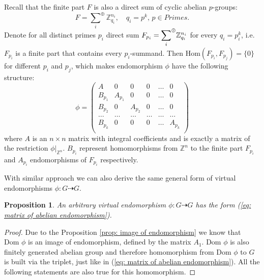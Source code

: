 \documentclass[a4paper,12pt]{amsart}
\newtheorem{proposition}[theorem]{Proposition}
\theoremstyle{definition}
\newcommand{\Dom}{\text{Dom }}
\newcommand{\Hom}{\text{Hom}}
\begin{document}
	
	Recall that the finite part $F$ is also a direct sum of cyclic abelian $p$-groups:
	$$
	F = {\sum_{i}}^\oplus \mathbb{Z}_{q_i}^{n_i}, \quad q_i = p^k, \, p \in Primes.
	$$
	Denote for all distinct primes $p_{i}$ direct sum $F_{p_i} = {\mathlarger\sum_{i}}^\oplus \mathbb{Z}_{q_i}^{n_i}$ for every $q_i = p_i^k$, i.e. $F_{p_i}$ is a finite part that contains every $p_i$-summand. Then $\Hom(F_{p_i}, F_{p_j}) = \{0\}$ for different $p_i$ and $p_j$, which makes endomorphism $\phi$ have the following structure:
	\begin{equation} \label{eq: matrix of abelian endomorphism}	
		\phi = 		
		\begin{pmatrix}
			A       &  0       & 0        & 0 & \dots & 0 \\  
			B_{p_1} &  A_{p_1} & 0        & 0 & \dots & 0 \\   
			B_{p_2} &  0       & A_{p_2}  & 0 & \dots & 0 \\ 
			\dots     & \dots    & \dots    & \dots & \dots & \dots  \\
			B_{p_k} &  0       & 0        & 0 & \dots & A_{p_k} \\  
		\end{pmatrix}
	\end{equation} 
	where $A$ is an $n \times n$ matrix with integral coefficients and is exactly a matrix of the restriction $\phi|_{\mathbb{Z}^n}$. $B_{p_i}$ represent homomorphisms from $\mathbb{Z}^n$ to the finite part $F_{p_i}$ and $A_{p_i}$ endomorphisms of $F_{p_i}$ respectively.
	
	With similar approach we can also derive the same general form of virtual endomorphisms $\phi : G \dashrightarrow G$. 
	
	\begin{proposition}
		An arbitrary virtual endomorphism $\phi : G \dashrightarrow G$ has the form (\ref{eq: matrix of abelian endomorphism}).
	\end{proposition}
	
	\begin{proof}
		Due to the Proposition \ref{prop: image of endomorphism} we know that $\Dom \phi$ is an image of endomorphism, defined by the matrix $A_1$. $\Dom \phi$ is also finitely generated abelian group and therefore homomorphism from $\Dom \phi$ to $G$ is built via the triplet, just like in (\ref{eq: matrix of abelian endomorphism}). All the following statements are also true for this homomorphism.
	\end{proof}
\end{document}
